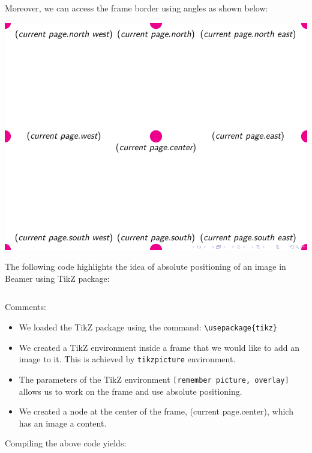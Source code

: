 \begin{column}{0.5\textwidth}
Moreover, we can access the frame border using angles as shown below:

\includegraphics[page=2]{examples/beamer/beamer-frame-position.pdf}

The following code highlights the idea of absolute positioning of an image in Beamer using TikZ package:

\inputminted[linenos=true]{latex}{examples/beamer/figure-position-with-tikz1.tex}

Comments:

\begin{itemize}
  \item We loaded the TikZ package using the command: \verb|\usepackage{tikz}|
  \item We created a TikZ environment inside a frame that we would like to add an image to it. This is achieved by \verb|tikzpicture| environment.
  \item The parameters of the TikZ environment \verb|[remember picture, overlay]| allows us to work on the frame and use absolute positioning.
  \item We created a node at the center of the frame, (current page.center), which has an image a content.
\end{itemize}

Compiling the above code yields:


\end{column}
